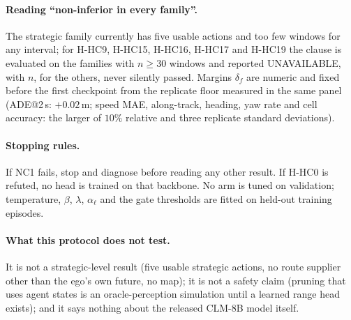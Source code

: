 \paragraph{Reading ``non-inferior in every family''.} The strategic family currently has five usable actions and too few windows for any interval; for H-HC9, H-HC15, H-HC16, H-HC17 and H-HC19 the clause is evaluated on the families with $n\ge30$ windows and reported UNAVAILABLE, with $n$, for the others, never silently passed. Margins $\delta_f$ are numeric and fixed before the first checkpoint from the replicate floor measured in the same panel (ADE@2\,s: $+0.02$\,m; speed MAE, along-track, heading, yaw rate and cell accuracy: the larger of $10\%$ relative and three replicate standard deviations).

\paragraph{Stopping rules.}
If NC1 fails, stop and diagnose before reading any other result. If H-HC0 is refuted, no head is trained on that backbone. No arm is tuned on validation; temperature, $\beta$, $\lambda$, $\alpha_\ell$ and the gate thresholds are fitted on held-out training episodes.

\paragraph{What this protocol does not test.}
It is not a strategic-level result (five usable strategic actions, no route supplier other than the ego's own future, no map); it is not a safety claim (pruning that uses agent states is an oracle-perception simulation until a learned range head exists); and it says nothing about the released CLM-8B model itself.
